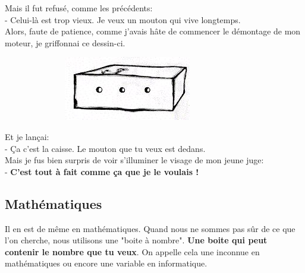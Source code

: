 \documentclass[12pt]{article}
\begin{document}
\begin{multicols}{2}
  Mais il fut refusé, comme les précédents: \\
  - Celui-là est trop vieux. Je veux un mouton qui vive longtemps. \\
  Alors, faute de patience, comme j'avais hâte de commencer le démontage de mon moteur, je griffonnai ce dessin-ci.
  
  \begin{figure}[H]
        \centering
        \includegraphics[width=0.5\linewidth]{3x2-calcul-litteral-1/sources/dm-mouton4.png}
  \end{figure}

  Et je lançai: \\
  - Ça c'est la caisse. Le mouton que tu veux est dedans. \\
  Mais je fus bien surpris de voir s'illuminer le visage de mon jeune juge: \\
  - \textbf{C'est tout à fait comme ça que je le voulais ! }
\end{multicols}

\subsection*{Mathématiques}
Il en est de même en mathématiques. Quand nous ne sommes pas sûr de ce que l’on cherche, nous utilisons une "boite à nombre". \textbf{Une boite qui peut contenir le nombre que tu veux}. On appelle cela une inconnue en mathématiques ou encore une variable en informatique. \\

\vspace{0.4cm}
\end{document}
